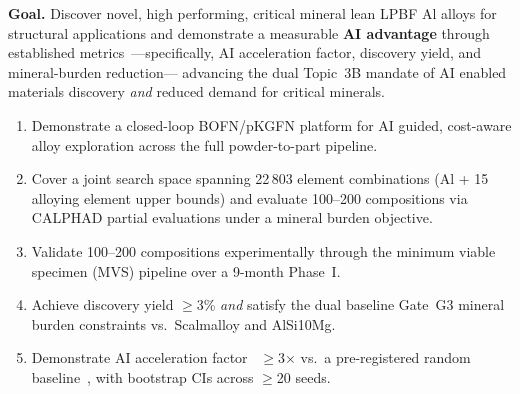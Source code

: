 \documentclass[11pt,letterpaper]{article}
\newcommand{\guidance}[1]{\todo[inline,color=blue!20]{#1}}
\newcommand{\kmin}{2}                    %
\newcommand{\kmax}{8}                    %
\newcounter{elemctr}
\newcommand{\elementcount}{\theelemctr}  %
\newcommand{\subsystemcount}{22\,803}    %
\begin{document}


\noindent\textbf{Goal.} Discover novel, high performing, critical mineral lean LPBF Al alloys for structural applications and demonstrate a
measurable \textbf{AI advantage} through established
metrics~\cite{tom_2024_acschemr}---specifically, AI acceleration factor, discovery yield, and mineral-burden reduction--- advancing the dual Topic~3B
mandate of AI enabled materials discovery \emph{and} reduced demand
for critical minerals.

\begin{enumerate}[label=\textbf{O\arabic*.},leftmargin=2em]
  \item Demonstrate a closed-loop BOFN/pKGFN platform for AI guided,
        cost-aware alloy exploration across the full powder-to-part pipeline.
  \item Cover a joint search space spanning \subsystemcount{} element
        combinations (Al + 15 alloying element upper bounds)
        and evaluate 100--200 compositions via CALPHAD partial evaluations
        under a mineral burden objective.
  \item Validate 100--200 compositions experimentally through the
        minimum viable specimen (MVS) pipeline over a 9-month Phase~I.
  \item Achieve discovery yield $\geq$3\%
        \emph{and} satisfy the
        dual baseline Gate~G3 mineral burden constraints vs.\ Scalmalloy
        and AlSi10Mg.
  \item Demonstrate AI acceleration factor~\cite{tom_2024_acschemr}
        $\geq$3$\times$ vs.\ a pre-registered random
        baseline~\cite{sabanzagil_2025_s4358802}, with bootstrap CIs
        across $\geq$20 seeds.
\end{enumerate}
\end{document}
